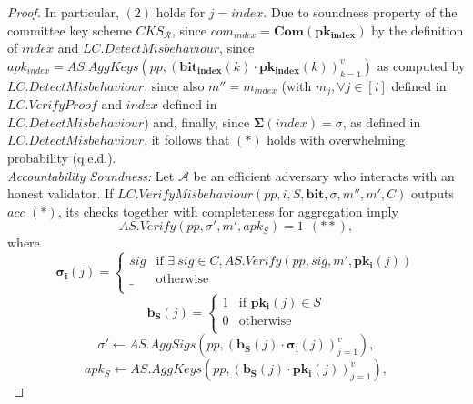 \begin{proof}
\noindent In particular, $(2)$ holds for $j = \mathit{index}$. Due to soundness property of the committee key scheme $\mathit{CKS_{\mathcal{R}}}$, 
since $\mathit{com_{\mathit{index}}} = \mathbf{Com}(\mathbf{pk_{\mathbf{index}}})$ by the definition of $\mathit{index}$ and 
$\mathit{LC.DetectMisbehaviour}$, since $\mathit{apk_{\mathit{index}}} = \mathit{AS.AggKeys}(\mathit{pp}, 
(\mathbf{bit_{\mathbf{index}}}(k) \cdot \mathbf{pk_{\mathbf{index}}}(k))_{k=1}^v)$ as computed by $\mathit{LC.DetectMisbehaviour}$, 
since also $m'' = m_{\mathit{index}}$ (with $m_j, \forall j \in [i]$ defined in $\mathit{LC.VerifyProof}$ and $\mathit{index}$ defined 
in \\ $\mathit{LC.DetectMisbehaviour}$) and, finally, since $\mathbf{\Sigma}(\mathit{index}) = \sigma$, as defined in $\mathit{LC.DetectMisbehaviour}$, 
it follows that $(*)$ holds with overwhelming probability (q.e.d.). \\
 
\noindent \textit{Accountability Soundness:} Let $\mathcal{A}$ be an efficient adversary who interacts with an honest validator. If $\mathit{LC.VerifyMisbehaviour}(\mathit{pp}, i, S, \mathbf{bit}, \sigma, m'', m', C)$ 
outputs $\mathit{acc}$ $(\ast)$, its checks together with completeness for aggregation imply 
$$\mathit{AS.Verify}(\mathit{pp}, \sigma', m', \mathit{apk_S}) = 1 \ \ (\ast\ast),$$
where 
\begin{equation*}
  \mathbf{\sigma_i}(j) =
    \begin{cases}
      \mathit{sig} & \text{if }  \exists \ \mathit{sig} \in C, \mathit{AS.Verify}(\mathit{pp}, \mathit{sig}, m', \mathbf{pk_i}(j)) \\
      \_ & \text{otherwise} \\
    \end{cases}       
\end{equation*}
\begin{equation*}
  \mathbf{b_{S}}(j) =
    \begin{cases}
      1 & \text{if }  \mathbf{pk_i}(j) \in S \\
      0 & \text{otherwise} \\
    \end{cases}       
\end{equation*}
$$ \sigma' \leftarrow  \mathit{AS.AggSigs}(\mathit{pp}, (\mathbf{b_{S}}(j) \cdot \mathbf{\sigma_i}(j))_{j=1}^v),$$
$$\mathit{apk_S} \leftarrow \mathit{AS.AggKeys}(\mathit{pp},(\mathbf{b_{S}}(j) \cdot \mathbf{pk_i}(j))_{j=1}^v),$$


\end{proof}
